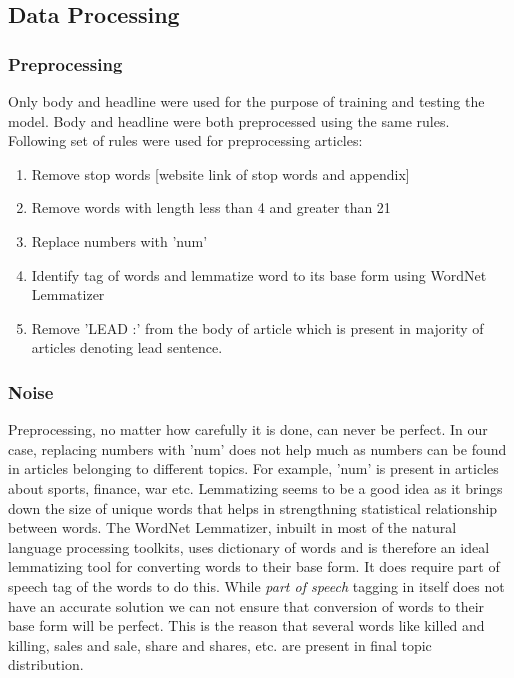 \documentclass[a4paper]{article}
\begin{document}
\subsection{Data Processing} \label{data}
\subsubsection{Preprocessing}
Only body and headline were used for the purpose of training and testing the model. Body and headline were both preprocessed using the same rules. 
Following set of rules were used for preprocessing articles:
\begin{enumerate}
\item Remove stop words [website link of stop words and  appendix]
\item Remove words with length less than 4 and greater than 21
\item Replace numbers with 'num'
\item Identify tag of words and lemmatize word to its base form using WordNet Lemmatizer
\item Remove 'LEAD :' from the body of article which is present in majority of articles denoting lead sentence.
\end{enumerate}


\subsubsection{Noise}
Preprocessing, no matter how carefully it is done, can never be perfect. In our case, replacing numbers with 'num' does not help much as numbers can be found in articles belonging to different topics. For example, 'num' is present in articles about sports, finance, war etc. Lemmatizing seems to be a good idea as it brings down the size of unique words that helps in strengthning statistical relationship between words. The WordNet Lemmatizer, inbuilt in most of the natural language processing toolkits, uses dictionary of words and is therefore an ideal lemmatizing tool for converting words to their base form. It does require part of speech tag of the words to do this. While \textit{part of speech} tagging in itself does not have an accurate solution we can not ensure that conversion of words to their base form will be perfect. This is the reason that several words like killed and killing, sales and sale, share and shares, etc. are present in final topic distribution.
\end{document}
